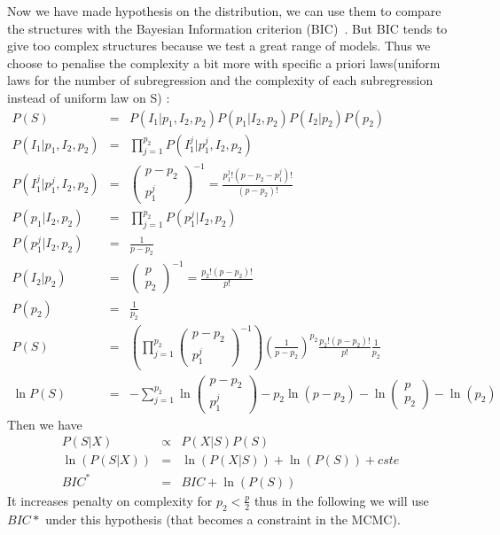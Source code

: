 \documentclass[11pt,a4paper]{article}
\begin{document}
	
	Now we have made hypothesis on the distribution, we can use them to compare the structures with the Bayesian Information criterion (BIC)~\cite{BIChuard}. But BIC tends to give too complex structures because we test a great range of models. Thus we choose to penalise the complexity a bit more with specific a priori laws(uniform laws for the number of subregression and the complexity of each subregression instead of uniform law on S) :
	\begin{eqnarray}
		P(S)&=&P(I_1 | p_1,I_2,p_2)P(p_1|I_2,p_2)P(I_2|p_2)P(p_2) \\
		P(I_1 | p_1,I_2,p_2)&=&\prod_{j =1}^{p_2}P(I_1^j|p_1^j,I_2,p_2) \\
		P(I_1^j|p_1^j,I_2,p_2)&=&\left(\begin{array}{c}
			p-p_2 \\ 
			p_1^j
			\end{array}  \right)^{-1} =\frac{p_1^j ! (p-p_2-p_1^j)!}{(p-p_2)!}\\
		P(p_1|I_2,p_2)&=&\prod_{j =1}^{p_2}P(p_1^j|I_2,p_2)		\\
		P(p_1^j|I_2,p_2)&=&\frac{1}{p-p_2}  \\
		P(I_2|p_2)&=&\left(\begin{array}{c}
			p \\ 
			p_2
			\end{array}  \right)^{-1}=\frac{p_2!(p-p_2)!}{p!}\\
		P(p_2) &=&\frac{1}{p_2} \\
		P(S)&=&\left(\prod_{j =1}^{p_2}\left(\begin{array}{c}
			p-p_2 \\ 
			p_1^j
			\end{array}  \right)^{-1}\right) \left(\frac{1}{p-p_2}\right)^{p_2}\frac{p_2!(p-p_2)!}{p!}\frac{1}{p_2} \\
			\ln P(S) &=& -\sum_{j=1}^{p_2}	\ln\left(\begin{array}{c}
			p-p_2 \\ 
			p_1^j
			\end{array}  \right)
			-p_2\ln (p-p_2)
			-\ln\left(\begin{array}{c}
			p \\ 
			p_2
			\end{array}  \right)
			-\ln( p_2	)
	\end{eqnarray}
	Then we have 
	\begin{eqnarray}
		P(S|X)&\propto &P(X|S)P(S) \\
		\ln(P(S|X))&=&\ln(P(X|S))+\ln(P(S))+cste \\
		BIC^*&=&BIC +\ln(P(S)) \label{Bicstar}
	\end{eqnarray}		
	It increases penalty on complexity for $p_2<\frac{p}{2}$ thus in the following we will use $BIC*$ under this hypothesis (that becomes a constraint in the MCMC).		
		
\end{document}
